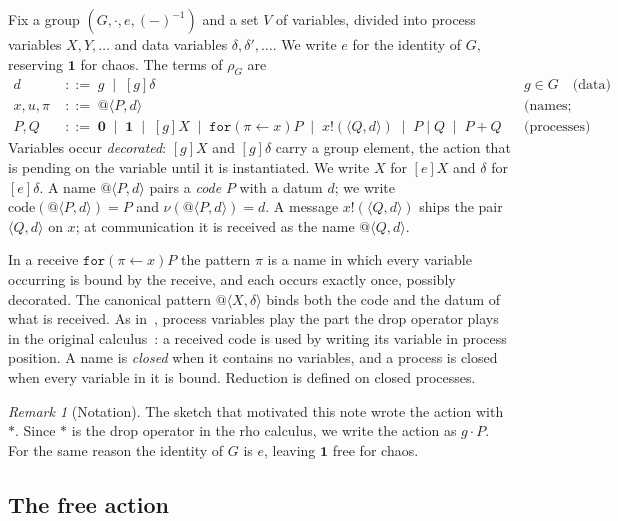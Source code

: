 \documentclass[11pt]{article}
\makeatletter
\theoremstyle{definition}
\theoremstyle{remark}
\newtheorem{remark}[theorem]{Remark}
\newcommand{\calc}{\rho_G}
\newcommand{\nil}{\mathbf{0}}
\newcommand{\chaos}{\mathbf{1}}
\newcommand{\rcv}[3]{\mathtt{for}(#1 \leftarrow #2)#3}
\newcommand{\out}[3]{#1!(\langle #2, #3\rangle)}
\newcommand{\qn}[2]{@\langle #1, #2\rangle}
\newcommand{\act}[2]{#1\cdot #2}
\newcommand{\code}{\mathrm{code}}
\newcommand{\fr}[2]{[#1]#2}
\makeatother
\begin{document}
Fix a group $(G,\cdot,e,(-)^{-1})$ and a set $V$ of variables, divided into
process variables $X,Y,\dots$ and data variables $\delta,\delta',\dots$. We
write $e$ for the identity of $G$, reserving $\chaos$ for chaos. The terms of
$\calc$ are
\begin{align*}
d &\;::=\; g \;\mid\; \fr{g}{\delta}
  && g\in G \quad\text{(data)}\\
x,u,\pi &\;::=\; \qn{P}{d}
  && \text{(names; patterns)}\\
P,Q &\;::=\; \nil \;\mid\; \chaos \;\mid\; \fr{g}{X} \;\mid\; \rcv{\pi}{x}{P}
  \;\mid\; \out{x}{Q}{d} \;\mid\; P \mid Q \;\mid\; P + Q
  && \text{(processes)}
\end{align*}
Variables occur \emph{decorated}: $\fr{g}{X}$ and $\fr{g}{\delta}$ carry a
group element, the action that is pending on the variable until it is
instantiated. We write $X$ for $\fr{e}{X}$ and $\delta$ for $\fr{e}{\delta}$.
A name $\qn{P}{d}$ pairs a \emph{code} $P$ with a datum $d$; we write
$\code(\qn{P}{d}) = P$ and $\nu(\qn{P}{d}) = d$. A message
$\out{x}{Q}{d}$ ships the pair $\langle Q, d\rangle$ on $x$; at communication
it is received as the name $\qn{Q}{d}$.

In a receive $\rcv{\pi}{x}{P}$ the pattern $\pi$ is a name in which every
variable occurring is bound by the receive, and each occurs exactly once,
possibly decorated. The
canonical pattern $\qn{X}{\delta}$ binds both the code and the datum of what
is received. As in~\cite{wsh}, process variables play the part the drop
operator plays in the original calculus~\cite{rho}: a received code is used by
writing its variable in process position. A name is \emph{closed} when it
contains no variables, and a process is closed when every variable in it is
bound. Reduction is defined on closed processes.

\begin{remark}[Notation]
The sketch that motivated this note wrote the action with $*$. Since $*$ is
the drop operator in the rho calculus, we write the action as $\act{g}{P}$.
For the same reason the identity of $G$ is $e$, leaving $\chaos$ free for
chaos.
\end{remark}

\subsection{The free action}
\end{document}
